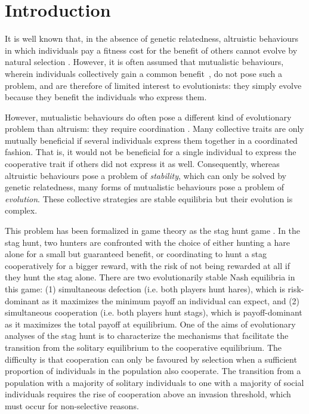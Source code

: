 \section{Introduction}
\label{intro}
  It is well known that, in the absence of genetic relatedness, altruistic behaviours in which individuals pay a fitness cost for the benefit of others cannot evolve by natural selection \parencite{Hamilton1964,West2007a}. However, it is often assumed that mutualistic behaviours, wherein individuals collectively gain a common benefit~\parencite{Leimar2003, Leimar2010}, do not pose such a problem, and are therefore of limited interest to evolutionists: they simply evolve because they benefit the individuals who express them.

  However, mutualistic behaviours do often pose a different kind of evolutionary problem than altruism: they require coordination \parencite{Alvard2001, Alvard2003, Drea2009a, Leimar2003}. Many collective traits are only mutually beneficial if several individuals express them together in a coordinated fashion. That is, it would not be beneficial for a single individual to express the cooperative trait if others did not express it as well. Consequently, whereas altruistic behaviours pose a problem of \textit{stability}, which can only be solved by genetic relatedness, many forms of mutualistic behaviours pose a problem of \textit{evolution}. These collective strategies are stable equilibria but their evolution is complex. 

  This problem has been formalized in game theory as the stag hunt game \parencite{Skyrms2004}. In the stag hunt, two hunters are confronted with the choice of either hunting a hare alone for a small but guaranteed benefit, or coordinating to hunt a stag cooperatively for a bigger reward, with the risk of not being rewarded at all if they hunt the stag alone. There are two evolutionarily stable Nash equilibria in this game: (1) simultaneous defection (i.e. both players hunt hares), which is risk-dominant as it maximizes the minimum payoff an individual can expect, and (2) simultaneous cooperation (i.e. both players hunt stags), which is payoff-dominant as it maximizes the total payoff at equilibrium. One of the aims of evolutionary analyses of the stag hunt is to characterize the mechanisms that facilitate the transition from the solitary equilibrium to the cooperative equilibrium. The difficulty is that cooperation can only be favoured by selection when a sufficient proportion of individuals in the population also cooperate. The transition from a population with a majority of solitary individuals to one with a majority of social individuals requires the rise of cooperation above an invasion threshold, which must occur for non-selective reasons.

